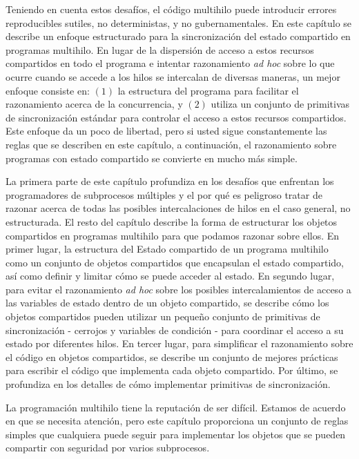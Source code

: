 \documentclass[10pt]{book}
\begin{document}
Teniendo en cuenta estos desafíos, el código multihilo puede introducir errores reproducibles sutiles, no deterministas, y no gubernamentales. En este capítulo se describe un enfoque estructurado para la sincronización del estado compartido en programas multihilo. En lugar de la dispersión de acceso a estos recursos compartidos en todo el programa e intentar razonamiento \textit{ad hoc} sobre lo que ocurre cuando se accede a los hilos se intercalan de diversas maneras, un mejor enfoque consiste en: $(1)$ la estructura del programa para facilitar el razonamiento acerca de la concurrencia, y $(2)$ utiliza un conjunto de primitivas de sincronización estándar para controlar el acceso a estos recursos compartidos. Este enfoque da un poco de libertad, pero si usted sigue constantemente las reglas que se describen en este capítulo, a continuación, el razonamiento sobre programas con estado compartido se convierte en mucho más simple.

La primera parte de este capítulo profundiza en los desafíos que enfrentan los programadores de subprocesos múltiples y el por qué es peligroso tratar de razonar acerca de todas las posibles intercalaciones de hilos en el caso general, no estructurada. El resto del capítulo describe la forma de estructurar los objetos compartidos en programas multihilo para que podamos razonar sobre ellos. En primer lugar, la estructura del Estado compartido de un programa multihilo como un conjunto de objetos compartidos que encapsulan el estado compartido, así como definir y limitar cómo se puede acceder al estado. En segundo lugar, para evitar el razonamiento \textit{ad hoc} sobre los posibles intercalamientos de acceso a las variables de estado dentro de un objeto compartido, se describe cómo los objetos compartidos pueden utilizar un pequeño conjunto de primitivas de sincronización - cerrojos y variables de condición - para coordinar el acceso a su estado por diferentes hilos. En tercer lugar, para simplificar el razonamiento sobre el código en objetos compartidos, se describe un conjunto de mejores prácticas para escribir el código que implementa cada objeto compartido. Por último, se profundiza en los detalles de cómo implementar primitivas de sincronización.

La programación multihilo tiene la reputación de ser difícil. Estamos de acuerdo en que se necesita atención, pero este capítulo proporciona un conjunto de reglas simples que cualquiera puede seguir para implementar los objetos que se pueden compartir con seguridad por varios subprocesos.
\end{document}
